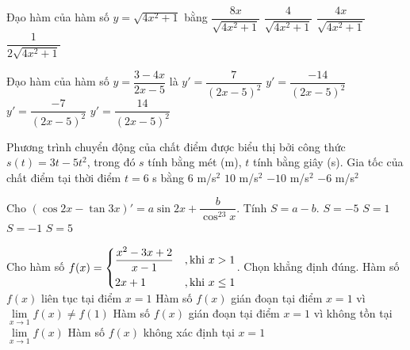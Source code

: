 \begin{ex}%
	Đạo hàm của hàm số $y=\sqrt{4x^2+1}$ bằng
	\choice
	{$\dfrac{8x}{\sqrt{4x^2+1}}$}
	{$\dfrac{4}{\sqrt{4x^2+1}}$}
	{\True $\dfrac{4x}{\sqrt{4x^2+1}}$}
	{$\dfrac{1}{2\sqrt{4x^2+1}}$}
\end{ex}
\begin{ex}%
	Đạo hàm của hàm số $y=\dfrac{3-4x}{2x-5}$ là
	\choice
	{$y'=\dfrac{7}{(2x-5)^2}$}
	{$y'=\dfrac{-14}{(2x-5)^2}$}
	{$y'=\dfrac{-7}{(2x-5)^2}$}
	{$y'=\dfrac{14}{(2x-5)^2}$}
\end{ex}
\begin{ex}%
	Phương trình chuyển động của chất điểm được biểu thị bởi công thức $s(t)=3t-5t^2$, trong đó $s$ tính bằng mét (m), $t$ tính bằng giây (s). Gia tốc của chất điểm tại thời điểm $t=6$ s bằng
	\choice
	{$6$ m/s$^2$}
	{$10$ m/s$^2$}
	{\True $-10$ m/s$^2$}
	{$-6$ m/s$^2$}
\end{ex}
\begin{ex}%
	Cho $\left(\cos 2x-\tan 3x\right)'=a\sin 2x+\dfrac{b}{\cos^23x}$. Tính $S=a-b$.
	\choice
	{$S=-5$}
	{\True $S=1$}
	{$S=-1$}
	{$S=5$}
\end{ex}
\begin{ex}%
	Cho hàm số $f(x)=\left\{\begin{aligned}&\dfrac{x^2-3x+2}{x-1}&,\text{khi }x>1\\&2x+1 &,\text{khi } x\le 1\end{aligned}\right.$. Chọn khẳng định đúng.
	\choice
	{Hàm số $f(x)$ liên tục tại điểm $x=1$}
	{Hàm số $f(x)$ gián đoạn tại điểm $x=1$ vì $\lim\limits_{x\to 1}f(x)\ne f(1)$}
	{\True Hàm số $f(x)$ gián đoạn tại điểm $x=1$ vì không tồn tại $\lim\limits_{x\to 1}f(x)$}
	{Hàm số $f(x)$ không xác định tại $x=1$}
\end{ex}
